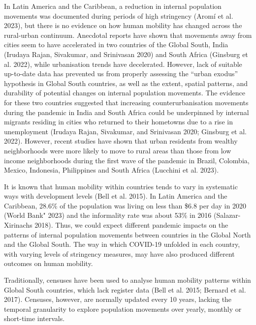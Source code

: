 \documentclass[11pt,letterpaper]{article}
\begin{document}
In Latin America and the Caribbean, a reduction in internal population
movements was documented during periods of high stringency (Aromí et al.
2023), but there is no evidence on how human mobility has changed across
the rural-urban continuum. Anecdotal reports have shown that movements
away from cities seem to have accelerated in two countries of the Global
South, India (Irudaya Rajan, Sivakumar, and Srinivasan 2020) and South
Africa (Ginsburg et al. 2022), while urbanisation trends have
decelerated. However, lack of suitable up-to-date data has prevented us
from properly assessing the ``urban exodus'' hypothesis in Global South
countries, as well as the extent, spatial patterns, and durability of
potential changes on internal population movements. The evidence for
these two countries suggested that increasing counterurbanisation
movements during the pandemic in India and South Africa could be
underpinned by internal migrants residing in cities who returned to
their hometowns due to a rise in unemployment (Irudaya Rajan, Sivakumar,
and Srinivasan 2020; Ginsburg et al. 2022). However, recent studies have
shown that urban residents from wealthy neighborhoods were more likely
to move to rural areas than those from low income neighborhoods during
the first wave of the pandemic in Brazil, Colombia, Mexico, Indonesia,
Philippines and South Africa (Lucchini et al. 2023).

It is known that human mobility within countries tends to vary in
systematic ways with development levels (Bell et al. 2015). In Latin
America and the Caribbean, 28.6\% of the population was living on less
than \$6.8 per day in 2020 (World Bank" 2023) and the informality rate
was about 53\% in 2016 (Salazar-Xirinachs 2018). Thus, we could expect
different pandemic impacts on the patterns of internal population
movements between countries in the Global North and the Global South.
The way in which COVID-19 unfolded in each country, with varying levels
of stringency measures, may have also produced different outcomes on
human mobility.

Traditionally, censuses have been used to analyse human mobility
patterns within Global South countries, which lack register data (Bell
et al. 2015; Bernard et al. 2017). Censuses, however, are normally
updated every 10 years, lacking the temporal granularity to explore
population movements over yearly, monthly or short-time intervals.
\end{document}
